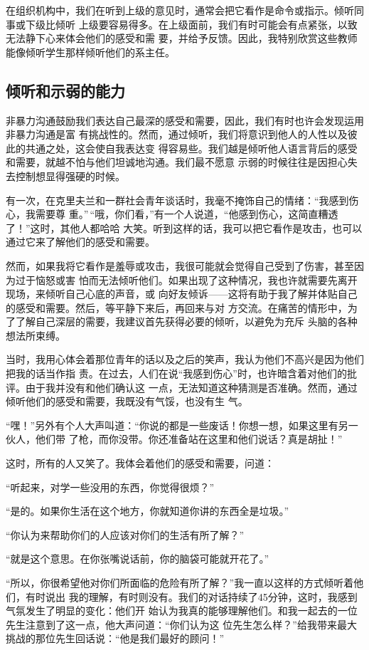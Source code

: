 \documentclass{ctexart}
\renewenvironment{quotation}{\setlength{\parskip}{0.5em}\setstretch{1.5}\kaishu\zihao{-5}\setlength{\parindent}{1em}}{\vspace{1em}}
\begin{document}
在组织机构中，我们在听到上级的意见时，通常会把它看作是命令或指示。倾听同事或下级比倾听
上级要容易得多。在上级面前，我们有时可能会有点紧张，以致无法静下心来体会他们的感受和需
要，并给予反馈。因此，我特别欣赏这些教师能像倾听学生那样倾听他们的系主任。


\subsection{倾听和示弱的能力}

非暴力沟通鼓励我们表达自己最深的感受和需要，因此，我们有时也许会发现运用非暴力沟通是富
有挑战性的。然而，通过倾听，我们将意识到他人的人性以及彼此的共通之处，这会使自我表达变
得容易些。我们越是倾听他人语言背后的感受和需要，就越不怕与他们坦诚地沟通。我们最不愿意
示弱的时候往往是因担心失去控制想显得强硬的时候。

有一次，在克里夫兰和一群社会青年谈话时，我毫不掩饰自己的情绪：``我感到伤心，我需要尊
重。''\,``哦，你们看，''有一个人说道，``他感到伤心，这简直糟透了！''这时，其他人都哈哈
大笑。听到这样的话，我可以把它看作是攻击，也可以通过它来了解他们的感受和需要。

然而，如果我将它看作是羞辱或攻击，我很可能就会觉得自己受到了伤害，甚至因为过于恼怒或害
怕而无法倾听他们。如果出现了这种情况，我也许就需要先离开现场，来倾听自己心底的声音，或
向好友倾诉------这将有助于我了解并体贴自己的感受和需要。然后，等平静下来后，再回来与对
方交流。在痛苦的情形中，为了了解自己深层的需要，我建议首先获得必要的倾听，以避免为充斥
头脑的各种想法所束缚。

当时，我用心体会着那位青年的话以及之后的笑声，我认为他们不高兴是因为他们把我的话当作指
责。在过去，人们在说``我感到伤心''时，也许暗含着对他们的批评。由于我并没有和他们确认这
一点，无法知道这种猜测是否准确。然而，通过倾听他们的感受和需要，我既没有气馁，也没有生
气。

``嘿！''另外有个人大声叫道：``你说的都是一些废话！你想一想，如果这里有另一伙人，他们带
了枪，而你没带。你还准备站在这里和他们说话？真是胡扯！''

这时，所有的人又笑了。我体会着他们的感受和需要，问道：


\begin{quotation}
	``听起来，对学一些没用的东西，你觉得很烦？''

	``是的。如果你生活在这个地方，你就知道你讲的东西全是垃圾。''

	``你认为来帮助你们的人应该对你们的生活有所了解？''

	``就是这个意思。在你张嘴说话前，你的脑袋可能就开花了。''

	``所以，你很希望他对你们所面临的危险有所了解？''我一直以这样的方式倾听着他们，有时说出
	我的理解，有时则没有。我们的对话持续了45分钟，这时，我感到气氛发生了明显的变化：他们开
	始认为我真的能够理解他们。和我一起去的一位先生注意到了这一点，他大声问道：``你们认为这
	位先生怎么样？''给我带来最大挑战的那位先生回话说：``他是我们最好的顾问！''
\end{quotation}
\end{document}
